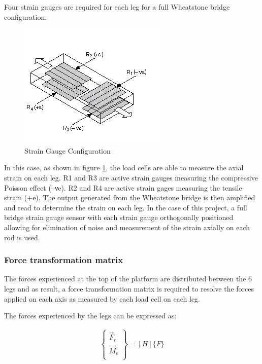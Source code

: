 Four strain gauges are required for each leg for a full Wheatstone bridge configuration.
\begin{center}
	\begin{figure}[H]
		\centering
		\includegraphics{Figures/loadConf}
		\caption[Strain Gauge Configuration]{Strain Gauge Configuration \cite{noauthor_measuring_nodate}}
		\label{strain}
	\end{figure}
\end{center}
In this case, as shown in figure \ref{strain}, the load cells are able to measure the axial strain on each leg. R1 and R3 are active strain gauges measuring the compressive Poisson effect (–νe). R2 and R4 are active strain gages measuring the tensile strain (+e). The output generated from the Wheatstone bridge is then amplified and read to determine the strain on each leg.
In the case of this project, a full bridge strain gauge sensor with each strain gauge orthogonally positioned allowing for elimination of noise and measurement of the strain axially on each rod is used.

\subsubsection*{Force transformation matrix}
The forces experienced at the top of the platform are distributed between the 6 legs and as result, a force transformation matrix is required to resolve the forces applied on each axis as measured by each load cell on each leg.

The forces experienced by the legs can be expressed as:
\begin{ceqn}
	\begin{align}
		\begin{Bmatrix}
			\vec{F}_e \\
			\vec{M}_e \\
		\end{Bmatrix} = [H]\{F\}
	\end{align}
\end{ceqn}


